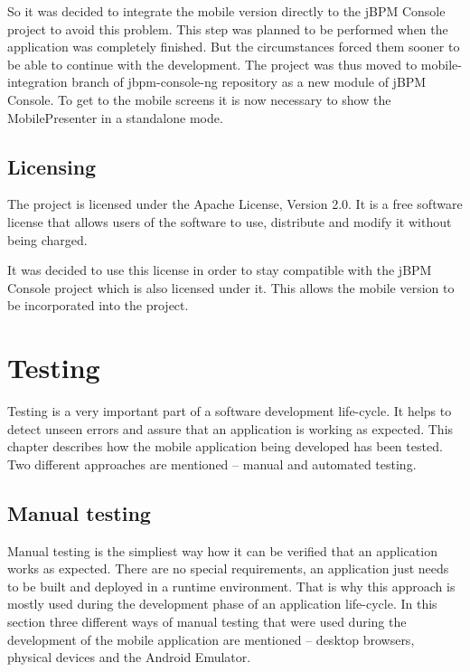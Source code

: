 \documentclass[12pt,oneside,final]{fithesis2}
\begin{document}
So it was decided to integrate the mobile version directly to the jBPM Console project to avoid this problem.
This step was planned to be performed when the application was completely finished.
But the circumstances forced them sooner to be able to continue with the development.
The project was thus moved to mobile-integration branch of jbpm-console-ng repository\footnotemark{} as a new module of jBPM Console.
To get to the mobile screens it is now necessary to show the MobilePresenter in a standalone mode.

\section{Licensing}
The project is licensed under the Apache License, Version 2.0\footnotemark{}.
It is a free software license that allows users of the software to use, distribute and modify it without being charged.

It was decided to use this license in order to stay compatible with the jBPM Console project which is also licensed under it.
This allows the mobile version to be incorporated into the project.

\chapter{Testing}
Testing is a very important part of a software development life-cycle.
It helps to detect unseen errors and assure that an application is working as expected.
This chapter describes how the mobile application being developed has been tested.
Two different approaches are mentioned -- manual and automated testing.

\section{Manual testing}
Manual testing is the simpliest way how it can be verified that an application works as expected.
There are no special requirements, an application just needs to be built and deployed in a runtime environment.
That is why this approach is mostly used during the development phase of an application life-cycle.
In this section three different ways of manual testing that were used during the development of the mobile application are mentioned -- desktop browsers, physical devices and the Android Emulator.
\end{document}
